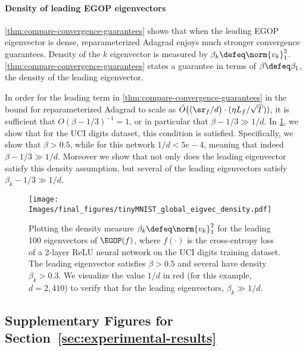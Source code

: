 \paragraph{Density of leading EGOP eigenvectors} \cref{thm:compare-convergence-guarantees} shows that when the leading EGOP eigenvector is dense, reparameterized Adagrad enjoys much stronger convergence guarantees. Density of the $k$ eigenvector is measured by $\beta_k\defeq \norm{v_k}^2_1$. \cref{thm:compare-convergence-guarantees} states a guarantee in terms of $\beta \defeq \beta_1$, the density of the leading eigenvector.

In order for the leading term in \cref{thm:compare-convergence-guarantees} in the bound for reparameterized Adagrad to scale as $\tilde{O}\big((\sr_f/d\big)\cdot(\eta L_f/\sqrt{T}))$, it is sufficient that $O(\beta-1/3)^{-1}=1$, or in particular that $\beta-1/3 \gg1/d$. In \cref{fig:MNIST-global-eigvec-density}, we show that for the UCI digits dataset, this condition is satisfied. Specifically, we show that $\beta > 0.5$, while for this network $1/d < 5e-4$, meaning that indeed $\beta-1/3 \gg1/d$. Moreover we show that not only does the leading eigenvector satisfy this density assumption, but several of the leading eigenvectors satisfy $\beta_k-1/3 \gg1/d$.
\begin{figure*}[h!]
    \centering        \texttt{[image: Images/final\_figures/tinyMNIST\_global\_eigvec\_density.pdf]}
    \caption{Plotting the density measure $\beta_k\defeq \norm{v_k}^2_1$ for the leading 100 eigenvectors of $\EGOP(f)$, where $f(\cdot)$ is the cross-entropy loss of a 2-layer ReLU neural network on the UCI digits training dataset. The leading eigenvector satisfies $\beta > 0.5$ and several have density $\beta_k > 0.3$. We visualize the value $1/d$ in red  (for this example, $d = 2,410$) to verify that for the leading eigenvectors, $\beta_k \gg 1/d$.}
    \label{fig:MNIST-global-eigvec-density}
\end{figure*}

\subsection{Supplementary Figures for Section~\ref{sec:experimental-results}}\label{ssec:sup-figs-main-experiments}

